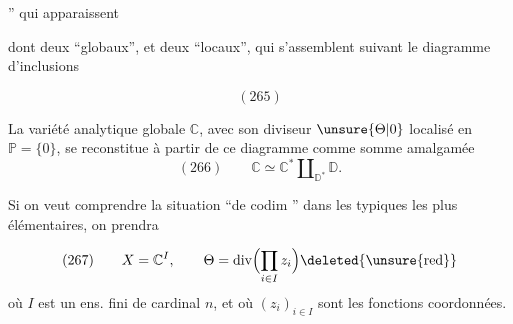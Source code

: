 '' qui apparaissent


dont deux ``globaux'', et deux ``locaux'', qui s'assemblent suivant le diagramme d'inclusions

\[
(265)
\]

La variété analytique globale $\mathbb C$, avec son diviseur $\unsure{\Theta|0}$ localisé en $\mathbb P=\{0\}$, se reconstitue à partir de ce diagramme comme somme amalgamée
\[
(266)\qquad \mathbb C\simeq \mathbb C^*\amalg_{\mathbb D^*}\mathbb D.
\]

Si on veut comprendre la situation ``de codim '' dans les  typiques les plus élémentaires, on prendra

\[
(267)\qquad X=\mathbb C^I,\qquad \Theta=\operatorname{div}\Bigl(\prod_{i\in I}z_i\Bigr)\deleted{\unsure{\mathrm{red}}}
\]
où $I$ est un ens. fini de cardinal $n$, et où $(z_i)_{i\in I}$ sont les fonctions coordonnées.

